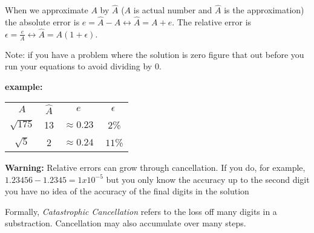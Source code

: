 \documentclass{article}
\newcommand{\n}{\newline}
\begin{document}
	\begin{flushleft}
	When we approximate $A$ by $\hat{A}$ ($A$ is actual number and $\hat{A}$ is the approximation) the absolute error is $e=\hat{A}-A\leftrightarrow \hat{A}=A+e$.  The relative error is $\epsilon=\frac{e}{A}\leftrightarrow\hat{A}=A(1+\epsilon)$.  \n
	
	Note: if you have a problem where the solution is zero figure that out before you run your equations to avoid dividing by 0. \n
	
	\textbf{example:}
	\end{flushleft}
	\begin{tabular}{c c c c}
		$A$ & $\hat{A}$ & $e$ & $\epsilon$ \\
		$\sqrt{175}$ & 13 & $\approx0.23$ & $~2$\% \\
		$\sqrt{5}$ & 2 & $\approx0.24$ &  $~11$\%
	\end{tabular}
	\begin{flushleft}
		
	\textbf{Warning:} Relative errors can grow through cancellation.  If you do, for example, $1.23456-1.2345=1x10^{-5}$ but you only know the accuracy up to the second digit you have no idea of the accuracy of the final digits in the solution\n
	
	Formally, \textit{Catastrophic Cancellation} refers to the loss off many digits in a substraction.  Cancellation may also accumulate over many steps.
	\end{flushleft}
\end{document}
